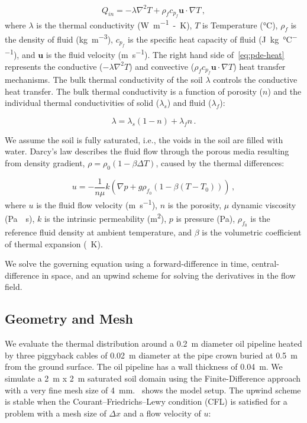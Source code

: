 \documentclass[Journal,letterpaper,InsideFigs]{ascelike-new}
\begin{document}
\begin{equation}
Q_{in} = - \lambda \nabla^2 T + \rho_f c_{p_f} \mathbf{u} \cdot \nabla T\,,
\label{eq:pde-heat}
\end{equation}
where $\lambda$ is the thermal conductivity (\si{\watt\per\meter-\kelvin}), $T$ is Temperature (\si{\celsius}), $\rho_f$ is the density of fluid (\si{\kilo\gram\per\meter\cubed}), $c_{p_f}$ is the specific heat capacity of fluid (\si{\joule\per\kilo\gram\per\celsius}), and $\mathbf{u}$ is the fluid velocity (\si{\meter\per\second}). The right hand side of~\cref{eq:pde-heat} represents the conductive ($- \lambda \nabla^2 T$) and convective ($ \rho_f c_{p_f} \mathbf{u} \cdot \nabla T$) heat transfer mechanisms. The bulk thermal conductivity of the soil $\lambda$ controls the conductive heat transfer. The bulk thermal conductivity is a function of porosity ($n$) and the individual thermal conductivities of solid ($\lambda_s$) and fluid ($\lambda_f$):

\begin{equation}
\lambda = \lambda_s ( 1 - n) + \lambda_f n\,.
\end{equation}

We assume the soil is fully saturated, i.e., the voids in the soil are filled with water. Darcy's law describes the fluid flow through the porous media resulting from density gradient, $\rho = \rho_0 (1 - \beta \Delta T)$, caused by the thermal differences:

\begin{equation}
u = - \frac{1}{n \mu} k \left(\nabla p + g \rho_{f_0} \left(1 - \beta (T - T_0)\right)\right)\,,
\end{equation}
where $u$ is the fluid flow velocity (\si{\meter\per\second}), $n$ is the porosity, $\mu$ dynamic viscosity (\si{\pascal\cdot\second}), $k$ is the intrinsic permeability (\si{\meter\squared}), $p$ is pressure (\si{\pascal}), $\rho_{f_0}$ is the reference fluid density at ambient temperature, and $\beta$ is the volumetric coefficient of thermal expansion (\si{\per\kelvin}). 

We solve the governing equation using a forward-difference in time, central-difference in space, and an upwind scheme for solving the derivatives in the flow field. 

\subsection*{Geometry and Mesh}

We evaluate the thermal distribution around a \SI{0.2}{\meter} diameter oil pipeline heated by three piggyback cables of \SI{0.02}{\meter} diameter at the pipe crown buried at \SI{0.5}{\meter} from the ground surface. The oil pipeline has a wall thickness of \SI{0.04}{\meter}. We simulate a \SI{2}{\meter} x \SI{2}{\meter} saturated soil domain using the Finite-Difference approach with a very fine mesh size of \SI{4}{\milli\meter}.~ shows the model setup. The upwind scheme is stable when the Courant–Friedrichs–Lewy condition (CFL) is satisfied for a problem with a mesh size of $\Delta x$ and a flow velocity of $u$:
\end{document}
